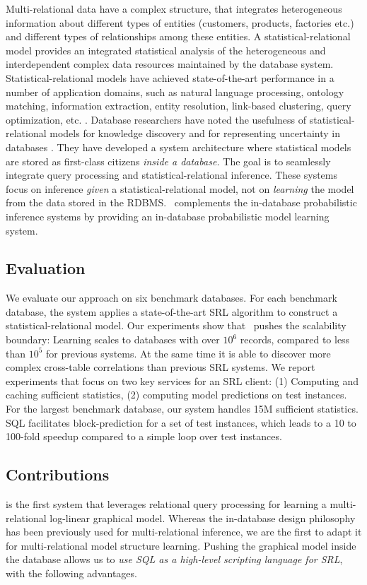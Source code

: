 \documentclass{IEEEtran}
\begin{document}
Multi-relational data have a complex structure, that integrates heterogeneous information about different types of entities (customers, products, factories etc.) and different types of relationships among these entities. 
A statistical-relational model provides an integrated statistical analysis of the heterogeneous and interdependent complex data resources maintained by the database system. 
Statistical-relational models have achieved state-of-the-art performance in a number of application domains, such as natural language processing, ontology matching, information extraction, entity resolution, link-based clustering, query optimization, etc. 
\cite{Domingos2009,Niu2011,Getoor2001}.
%
Database researchers have noted the usefulness of statistical-relational models for knowledge discovery and for representing uncertainty in databases 
\cite{Singh2013,Wang2008}.
They have developed a system architecture where statistical models are stored as first-class citizens {\em inside a database.} The goal is to seamlessly integrate query processing and statistical-relational inference. 
These systems focus  on inference {\em given} a statistical-relational model, not on {\em learning} the model from the data stored in the RDBMS.
\FB\ complements the in-database probabilistic inference systems by providing an in-database probabilistic model learning system. 


\subsection{Evaluation} We evaluate our approach on six benchmark databases. For each benchmark database, the system applies a state-of-the-art SRL algorithm to construct a statistical-relational model.
Our experiments show that \FB\ pushes the scalability boundary: Learning scales to databases with over $10^6$ records, compared to less than $10^5$ for previous systems. At the same time it is able to discover more complex cross-table correlations than previous SRL systems. We report experiments that focus on two key services for an SRL client: (1) Computing and caching sufficient statistics, (2) computing model predictions on test instances. For the largest benchmark database, our system handles 15M sufficient statistics. 
SQL facilitates block-prediction for a set of test instances, which leads to a 10 to 100-fold speedup compared to a simple loop over test instances.

\subsection{Contributions}
\FB  is the first system that leverages relational query processing for learning a multi-relational log-linear graphical model. Whereas the in-database design philosophy has been previously used for multi-relational inference, we are the first to adapt it for multi-relational model structure learning. Pushing the graphical model inside the database 
allows us to {\em use SQL as a high-level scripting language for SRL}, with the following advantages.
\end{document}
